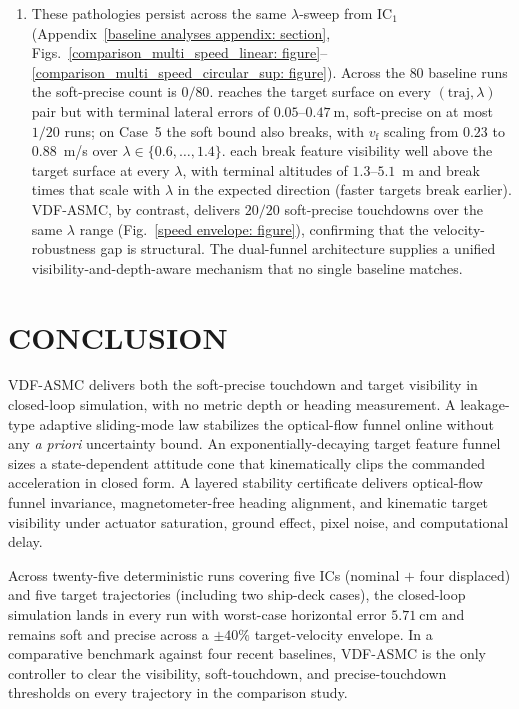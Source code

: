 \documentclass{IEEEtaes}
\begin{document}
\begin{enumerate}
    \item These pathologies persist across the same $\lambda$-sweep from IC$_1$ (Appendix~\ref{baseline analyses appendix: section}, Figs.~\ref{comparison_multi_speed_linear: figure}--\ref{comparison_multi_speed_circular_sup: figure}). Across the $80$ baseline runs the soft-precise count is $0/80$. \cite{zhang2026} reaches the target surface on every $(\text{traj},\lambda)$ pair but with terminal lateral errors of $0.05$--$0.47~\text{m}$, soft-precise on at most $1/20$ runs; on Case~5 the soft bound also breaks, with $v_\text{f}$ scaling from $0.23$ to $0.88$~m/s over $\lambda\in\{0.6,\ldots,1.4\}$. \cite{lin2022,lin2023,cho2022} each break feature visibility well above the target surface at every $\lambda$, with terminal altitudes of $1.3$--$5.1$~m and break times that scale with $\lambda$ in the expected direction (faster targets break earlier). VDF-ASMC, by contrast, delivers $20/20$ soft-precise touchdowns over the same $\lambda$ range (Fig.~\ref{speed envelope: figure}), confirming that the velocity-robustness gap is structural. The dual-funnel architecture supplies a unified visibility-and-depth-aware mechanism that no single baseline matches.
\end{enumerate}

\section{CONCLUSION}
\label{conclusion: section}
VDF-ASMC delivers both the soft-precise touchdown and target visibility in closed-loop simulation, with no metric depth or heading measurement. A leakage-type adaptive sliding-mode law stabilizes the optical-flow funnel online without any \emph{a priori} uncertainty bound. An exponentially-decaying target feature funnel sizes a state-dependent attitude cone that kinematically clips the commanded acceleration in closed form. A layered stability certificate delivers optical-flow funnel invariance, magnetometer-free heading alignment, and kinematic target visibility under actuator saturation, ground effect, pixel noise, and computational delay.

Across twenty-five deterministic runs covering five ICs (nominal $+$ four displaced) and five target trajectories (including two ship-deck cases), the closed-loop simulation lands in every run with worst-case horizontal error $5.71~\text{cm}$ and remains soft and precise across a $\pm 40\%$ target-velocity envelope. In a comparative benchmark against four recent baselines, VDF-ASMC is the only controller to clear the visibility, soft-touchdown, and precise-touchdown thresholds on every trajectory in the comparison study.
\end{document}
